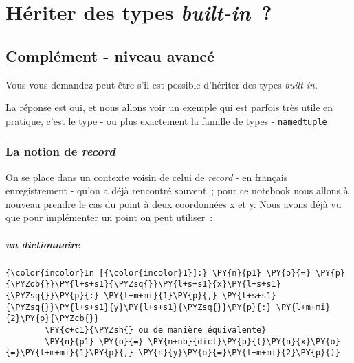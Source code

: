     
    
    
    

    

    \hypertarget{huxe9riter-des-types-built-in}{%
\section{\texorpdfstring{Hériter des types
\emph{built-in}~?}{Hériter des types built-in~?}}\label{huxe9riter-des-types-built-in}}

    \hypertarget{compluxe9ment---niveau-avancuxe9}{%
\subsection{Complément - niveau
avancé}\label{compluxe9ment---niveau-avancuxe9}}

    Vous vous demandez peut-être s'il est possible d'hériter des types
\emph{built-in}.

    La réponse est oui, et nous allons voir un exemple qui est parfois très
utile en pratique, c'est le type - ou plus exactement la famille de
types - \texttt{namedtuple}

    \hypertarget{la-notion-de-record}{%
\subsubsection{\texorpdfstring{La notion de
\emph{record}}{La notion de record}}\label{la-notion-de-record}}

    On se place dans un contexte voisin de celui de \emph{record} - en
français enregistrement - qu'on a déjà rencontré souvent~; pour ce
notebook nous allons à nouveau prendre le cas du point à deux
coordonnées x et y. Nous avons déjà vu que pour implémenter un point on
peut utiliser~:

    \hypertarget{un-dictionnaire}{%
\subparagraph{un dictionnaire}\label{un-dictionnaire}}

    \begin{Verbatim}[commandchars=\\\{\},frame=single,framerule=0.3mm,rulecolor=\color{cellframecolor}]
{\color{incolor}In [{\color{incolor}1}]:} \PY{n}{p1} \PY{o}{=} \PY{p}{\PYZob{}}\PY{l+s+s1}{\PYZsq{}}\PY{l+s+s1}{x}\PY{l+s+s1}{\PYZsq{}}\PY{p}{:} \PY{l+m+mi}{1}\PY{p}{,} \PY{l+s+s1}{\PYZsq{}}\PY{l+s+s1}{y}\PY{l+s+s1}{\PYZsq{}}\PY{p}{:} \PY{l+m+mi}{2}\PY{p}{\PYZcb{}}
        \PY{c+c1}{\PYZsh{} ou de manière équivalente}
        \PY{n}{p1} \PY{o}{=} \PY{n+nb}{dict}\PY{p}{(}\PY{n}{x}\PY{o}{=}\PY{l+m+mi}{1}\PY{p}{,} \PY{n}{y}\PY{o}{=}\PY{l+m+mi}{2}\PY{p}{)}
\end{Verbatim}


